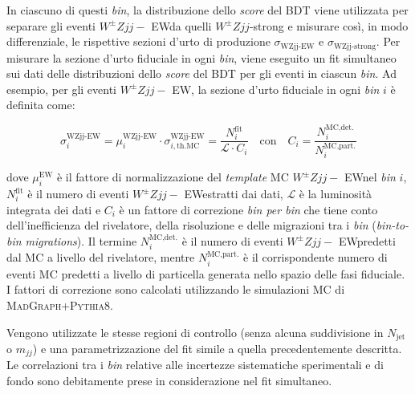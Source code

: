 \documentclass[11pt]{article}
\newcommand{\wzjjew}{$W^\pm Z jj-$ EW}
\newcommand{\wzjj}{$W^\pm Z jj$}
\newcommand{\mjj}{\ensuremath{m_{jj}}}
\begin{document}
In ciascuno di questi \textit{bin}, la distribuzione dello \textit{score} del BDT viene utilizzata per separare gli eventi \wzjjew da quelli \wzjj-strong e misurare così, in modo differenziale, le rispettive sezioni d'urto di produzione $\sigma_{\text{WZjj-EW}}$ e $\sigma_{\text{WZjj-strong}}$. Per misurare la sezione d'urto fiduciale in ogni \textit{bin}, viene eseguito un fit simultaneo sui dati delle distribuzioni dello \textit{score} del BDT per gli eventi in ciascun \textit{bin}. Ad esempio, per gli eventi \wzjjew, la sezione d'urto fiduciale in ogni \textit{bin} $i$ è definita come:

\begin{equation}
\sigma_i^{\text{WZjj-EW}} = \mu_i^{\text{WZjj-EW}} \cdot \sigma_{i,\text{th.MC}}^{\text{WZjj-EW}} = \frac{N_i^{\text{fit}}}{\mathcal{L} \cdot C_i} \quad \text{con} \quad C_i = \frac{N_i^{\text{MC,det.}}}{N_i^{\text{MC,part.}}}
\label{eq:diff_cross_section}
\end{equation}

dove $\mu_i^{\text{EW}}$ è il fattore di normalizzazione del \textit{template} MC \wzjjew nel \textit{bin} $i$, $N_i^{\text{fit}}$ è il numero di eventi \wzjjew estratti dai dati, $\mathcal{L}$ è la luminosità integrata dei dati e $C_i$ è un fattore di correzione \textit{bin per bin} che tiene conto dell'inefficienza del rivelatore, della risoluzione e delle migrazioni tra i \textit{bin} (\textit{bin-to-bin migrations}). Il termine $N_i^{\text{MC,det.}}$ è il numero di eventi \wzjjew predetti dal MC a livello del rivelatore, mentre $N_i^{\text{MC,part.}}$ è il corrispondente numero di eventi MC predetti a livello di particella generata nello spazio delle fasi fiduciale. I fattori di correzione sono calcolati utilizzando le simulazioni MC di \textsc{MadGraph}+\textsc{Pythia8}. 

Vengono utilizzate le stesse regioni di controllo (senza alcuna suddivisione in $N_{\text{jet}}$ o $\mjj$) e una parametrizzazione del fit simile a quella precedentemente descritta. Le correlazioni tra i \textit{bin} relative alle incertezze sistematiche sperimentali e di fondo sono debitamente prese in considerazione nel fit simultaneo.
\end{document}
